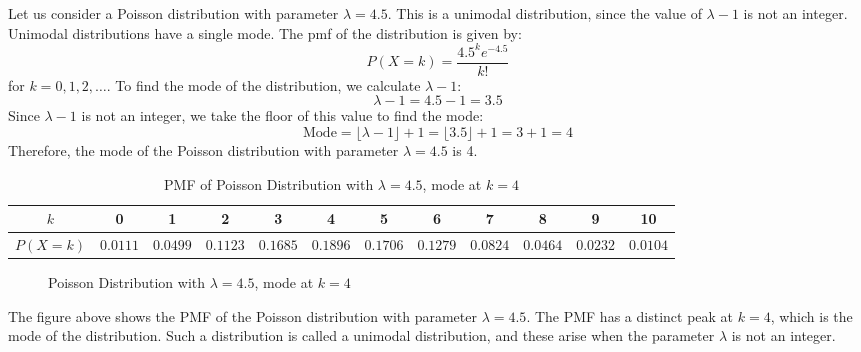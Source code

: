 \documentclass[openany]{book}
\begin{document}
\begin{example}
    Let us consider a Poisson distribution with parameter $\lambda = 4.5$. This is a unimodal distribution, since the value of $\lambda - 1$ is not an integer. Unimodal distributions have a single mode. The pmf of the distribution is given by:
    $$P(X = k) = \frac{4.5^k e^{-4.5}}{k!}$$
    for $k = 0, 1, 2, \ldots$. To find the mode of the distribution, we calculate $\lambda - 1$:
    $$\lambda - 1 = 4.5 - 1 = 3.5$$
    Since $\lambda - 1$ is not an integer, we take the floor of this value to find the mode:
    $$\text{Mode} = \lfloor \lambda - 1 \rfloor + 1 = \lfloor 3.5 \rfloor + 1 = 3 + 1 = 4$$
    Therefore, the mode of the Poisson distribution with parameter $\lambda = 4.5$ is 4.
    \begin{table}[H]
        \centering
        \begin{tabular}{c|ccccccccccc}
            $k$ & 0 & 1 & 2 & 3 & 4 & 5 & 6 & 7 & 8 & 9 & 10 \\
            \hline
            $P(X = k)$ & $0.0111$ & $0.0499$ & $0.1123$ & $0.1685$ & $0.1896$ & $0.1706$ & $0.1279$ & $0.0824$ & $0.0464$ & $0.0232$ & $0.0104$ \\
        \end{tabular}
        \caption{PMF of Poisson Distribution with $\lambda = 4.5$, mode at $k = 4$}
    \end{table}
    \begin{figure}[H]
        \centering
        \caption{Poisson Distribution with $\lambda = 4.5$, mode at $k = 4$}
    \end{figure}
The figure above shows the PMF of the Poisson distribution with parameter $\lambda = 4.5$. The PMF has a distinct peak at $k = 4$, which is the mode of the distribution. Such a distribution is called a unimodal distribution, and these arise when the parameter $\lambda$ is not an integer.
\end{example}
\end{document}
